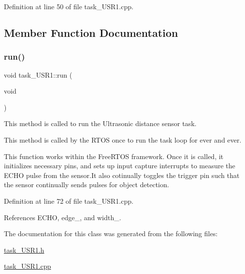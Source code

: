 Definition at line 50 of file task\+\_\+\+U\+S\+R1.\+cpp.



\subsection{Member Function Documentation}
\mbox{\label{classtask__USR1_a95b84a7b7f293a56470b74eb541fe346}} 
\subsubsection{\texorpdfstring{run()}{run()}}
{\footnotesize\ttfamily void task\+\_\+\+U\+S\+R1\+::run (\begin{DoxyParamCaption}\item[{void}]{ }\end{DoxyParamCaption})}



This method is called to run the Ultrasonic distance sensor task. 

This method is called by the R\+T\+OS once to run the task loop for ever and ever.

This function works within the Free\+R\+T\+OS framework. Once it is called, it initializes necessary pins, and sets up input capture interrupts to measure the E\+C\+HO pulse from the sensor.\+It also cotinually toggles the trigger pin such that the sensor continually sends pulses for object detection. 

Definition at line 72 of file task\+\_\+\+U\+S\+R1.\+cpp.



References E\+C\+HO, edge\+\_, and width\+\_.



The documentation for this class was generated from the following files\+:\begin{DoxyCompactItemize}
\item 
\mbox{\hyperlink{task__USR1_8h}{task\+\_\+\+U\+S\+R1.\+h}}\item 
\mbox{\hyperlink{task__USR1_8cpp}{task\+\_\+\+U\+S\+R1.\+cpp}}\end{DoxyCompactItemize}
